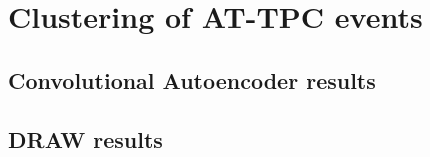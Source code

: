 \chapter{Clustering of AT-TPC events}

\section{Convolutional Autoencoder results}
\section {DRAW results}